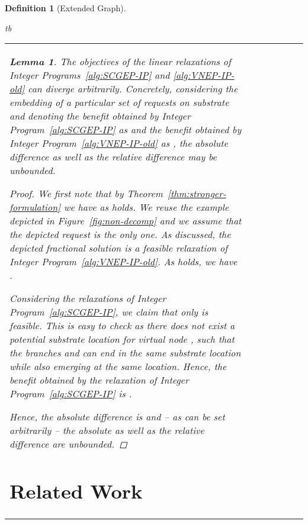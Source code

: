 \documentclass[10pt, conference, letterpaper]{IEEEtran}
\newtheorem{lemma}[theorem]{Lemma}
\newtheorem{definition}[theorem]{Definition}
\begin{document}
\begin{definition}[Extended Graph]
{\begin{IPFormulation}{tb}
{\begin{tabular}{FFCLLBB}
\begin{lemma}
The objectives of the linear relaxations of Integer Programs~\ref{alg:SCGEP-IP} and \ref{alg:VNEP-IP-old} can diverge arbitrarily. Concretely, considering the embedding of a particular set of requests  on substrate  and denoting the benefit obtained by Integer Program~\ref{alg:SCGEP-IP} as  and the benefit obtained by Integer Program~\ref{alg:VNEP-IP-old} as , the absolute difference  as well as the relative difference  may be unbounded. 
\begin{proof}
We first note that by Theorem~\ref{thm:stronger-formulation} we have  as  holds. We reuse the example depicted in Figure~\ref{fig:non-decomp} and we assume that the depicted request is the only one. As discussed, the depicted fractional solution is a feasible relaxation of Integer Program~\ref{alg:VNEP-IP-old}. As  holds, we have .  

Considering the relaxations of Integer Program~\ref{alg:SCGEP-IP}, we claim that only  is feasible. This is easy to check as there does not exist a potential substrate location for virtual node , such that the branches  and  can end in the same substrate location while also emerging at the same location. Hence, the benefit obtained by the relaxation of Integer Program~\ref{alg:SCGEP-IP} is .

Hence, the absolute difference is  and -- as  can be set arbitrarily -- the absolute as well as the relative difference are unbounded.
\end{proof}
\end{lemma}



\section{Related Work}\label{sec:relwork}


\end{tabular}}
\end{IPFormulation}}
\end{definition}
\end{document}
